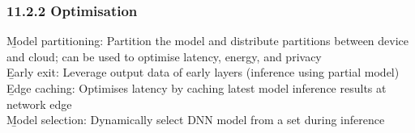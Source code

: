 \subsubsection{11.2.2 Optimisation}
\b{Model partitioning:} Partition the model and distribute partitions between device and cloud; can be used to optimise latency, energy, and privacy\\[0.5em]
\b{Early exit:} Leverage output data of early layers (inference using partial model)\\[0.5em]
\b{Edge caching:}  Optimises latency by caching latest model inference results at network edge\\[0.5em]
\b{Model selection:} Dynamically select DNN model from a set during inference\\[0.5em]













